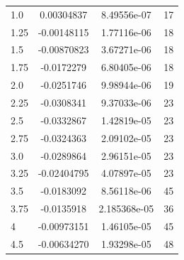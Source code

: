 \documentclass[twoside, 10pt, ptm]{article}
\begin{document}
\begin{multicols}{2}
\begin{center}
\begin{tabular}{ | l | c | c | c | }
1.0 & 0.00304837 & 8.49556e-07 & 17 \\
1.25 & -0.00148115 & 1.77116e-06 & 18 \\
1.5 & -0.00870823 & 3.67271e-06 & 18 \\
1.75 & -0.0172279 & 6.80405e-06 & 18 \\
2.0 & -0.0251746 & 9.98944e-06 & 19 \\
2.25 & -0.0308341 & 9.37033e-06 & 23 \\
2.5 & -0.0332867 & 1.42819e-05 & 23 \\
2.75 & -0.0324363 & 2.09102e-05 & 23 \\
3.0 & -0.0289864 & 2.96151e-05 & 23 \\
3.25 & -0.02404795 & 4.07897e-05 & 23 \\
3.5 & -0.0183092 & 8.56118e-06 & 45 \\
3.75 & -0.0135918 & 2.185368e-05 & 36 \\
4 & -0.00973151 & 1.46105e-05 & 45 \\
4.5 & -0.00634270 & 1.93298e-05 & 48 \\

\end{tabular}
\end{center}
\end{multicols}
\end{document}
